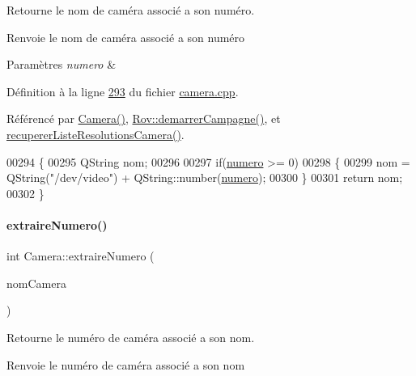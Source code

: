 Retourne le nom de caméra associé a son numéro. 

\begin{DoxyReturn}{Renvoie}
le nom de caméra associé a son numéro 
\end{DoxyReturn}

\begin{DoxyParams}{Paramètres}
{\em numero} & \\
\hline
\end{DoxyParams}


Définition à la ligne \hyperlink{camera_8cpp_source_l00293}{293} du fichier \hyperlink{camera_8cpp_source}{camera.\+cpp}.



Référencé par \hyperlink{camera_8cpp_source_l00012}{Camera()}, \hyperlink{rov_8cpp_source_l00123}{Rov\+::demarrer\+Campagne()}, et \hyperlink{camera_8cpp_source_l00139}{recuperer\+Liste\+Resolutions\+Camera()}.


\begin{DoxyCode}
00294 \{
00295     QString nom;
00296 
00297     \textcolor{keywordflow}{if}(\hyperlink{class_camera_ae5cda5df3c9c49b88fff15389a1bbc64}{numero} >= 0)
00298     \{
00299         nom = QString(\textcolor{stringliteral}{"/dev/video"}) + QString::number(\hyperlink{class_camera_ae5cda5df3c9c49b88fff15389a1bbc64}{numero});
00300     \}
00301     \textcolor{keywordflow}{return} nom;
00302 \}
\end{DoxyCode}
\mbox{\label{class_camera_aa3fdc8b3feac7074911b472c4edb9dec}} 
\paragraph{\texorpdfstring{extraire\+Numero()}{extraireNumero()}}
{\footnotesize\ttfamily int Camera\+::extraire\+Numero (\begin{DoxyParamCaption}\item[{Q\+String}]{nom\+Camera }\end{DoxyParamCaption})\hspace{0.3cm}{\ttfamily [static]}}



Retourne le numéro de caméra associé a son nom. 

\begin{DoxyReturn}{Renvoie}
le numéro de caméra associé a son nom 
\end{DoxyReturn}

